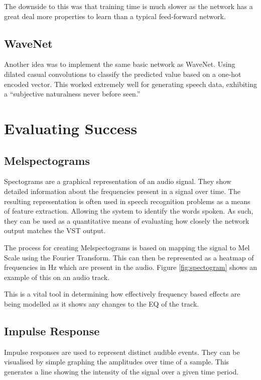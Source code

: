 \documentclass{l4proj}
\begin{document}
The downside to this was that training time is much slower as the
network has a great deal more properties to learn than a typical
feed-forward network.

\subsection{WaveNet}\label{wavenet-1}

Another idea was to implement the same basic network as WaveNet. Using
dilated casual convolutions to classify the predicted value based on a
one-hot encoded vector. This worked extremely well for generating speech
data, exhibiting a ``subjective naturalness never before seen.''

\section{Evaluating Success}\label{evaluating-success}

\subsection{Melspectograms}\label{melspectograms}

Spectograms are a graphical representation of an audio signal. They show
detailed information about the frequencies present in a signal over
time. The resulting representation is often used in speech recognition
problems as a means of feature extraction. Allowing the system to
identify the words spoken. As such, they can be used as a quantitative
means of evaluating how closely the network output matches the VST
output.

The process for creating Melspectograms is based on mapping the signal
to Mel Scale using the Fourier Transform. This can then be represented
as a heatmap of frequencies in Hz which are present in the audio. Figure
\ref{fig:spectogram} shows an example of this on an audio track.

This is a vital tool in determining how effectively frequency based
effects are being modelled as it shows any changes to the EQ of the
track.

\subsection{Impulse Response}\label{impulse-response}

Impulse responses are used to represent distinct audible events. They
can be visualised by simple graphing the amplitudes over time of a
sample. This generates a line showing the intensity of the signal over a
given time period.
\end{document}
